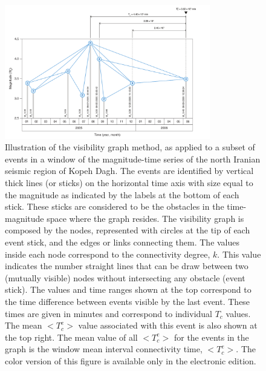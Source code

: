 \begin{figure}[t]
	\centering
	\includegraphics[width=0.8\textwidth]{figures/pdf/figure-01} 
	\caption{Illustration of the visibility graph method, as applied to a subset of events in a window of the magnitude-time series of the north Iranian seismic region of Kopeh Dagh. The events are identified by vertical thick lines (or sticks) on the horizontal time axis with size equal to the magnitude as indicated by the labels at the bottom of each stick. These sticks are considered to be the obstacles in the time-magnitude space where the graph resides. The visibility graph is composed by the nodes, represented with circles at the tip of each event stick, and the edges or links connecting them. The values inside each node correspond to the connectivity degree, $k$. This value indicates the number straight lines that can be draw between two (mutually visible) nodes without intersecting any obstacle (event stick). The values and time ranges shown at the top correspond to the time difference between events visible by the last event. These times are given in minutes and correspond to individual $T_c$ values. The mean $<$$T_c^e$$>$ value associated with this event is also shown at the top right. The mean value of all $<$$T_c^e$$>$ for the events in the graph is the window mean interval connectivity time, $<$$T_c^e$$>$. The color version of this figure is available only in the electronic edition.}
	\label{fig:vg}
\end{figure}


